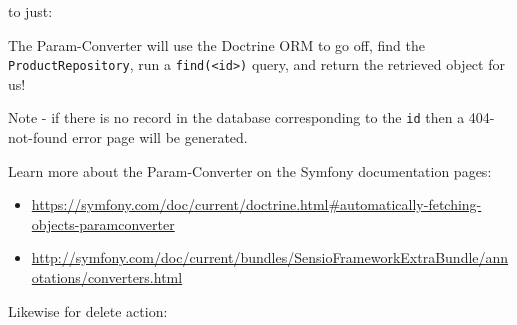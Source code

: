 \documentclass[a4paperpaper,openright]{book}
\newenvironment{Shaded}{}{}
\newcommand{\CommentTok}[1]{\textcolor[rgb]{0.38,0.63,0.69}{\textit{#1}}}
\newcommand{\KeywordTok}[1]{\textcolor[rgb]{0.00,0.44,0.13}{\textbf{#1}}}
\newcommand{\NormalTok}[1]{#1}
\newcommand{\OtherTok}[1]{\textcolor[rgb]{0.00,0.44,0.13}{#1}}
\newcommand{\StringTok}[1]{\textcolor[rgb]{0.25,0.44,0.63}{#1}}
\begin{document}
to just:

\begin{Shaded}
\end{Shaded}

The Param-Converter will use the Doctrine ORM to go off, find the
\texttt{ProductRepository}, run a
\texttt{find(\textless{}id\textgreater{})} query, and return the
retrieved object for us!

Note - if there is no record in the database corresponding to the
\texttt{id} then a 404-not-found error page will be generated.

Learn more about the Param-Converter on the Symfony documentation pages:

\begin{itemize}
\item
  \url{https://symfony.com/doc/current/doctrine.html\#automatically-fetching-objects-paramconverter}
\item
  \url{http://symfony.com/doc/current/bundles/SensioFrameworkExtraBundle/annotations/converters.html}
\end{itemize}

Likewise for delete action:
\end{document}
